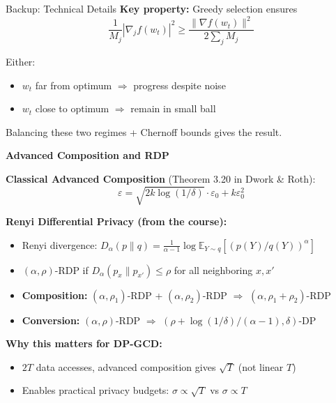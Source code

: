 \documentclass[10pt]{beamer}
\begin{document}
\begin{frame}[allowframebreaks]{Backup: Technical Details}
\vspace{0.5em}
\textbf{Key property:} Greedy selection ensures
\[
\frac{1}{M_j} |\nabla_j f(w_t)|^2 \geq \frac{\|\nabla f(w_t)\|^2}{2 \sum_j M_j}
\]

\vspace{0.5em}
Either:
\begin{itemize}
\item $w_t$ far from optimum $\Rightarrow$ progress despite noise
\item $w_t$ close to optimum $\Rightarrow$ remain in small ball
\end{itemize}

Balancing these two regimes + Chernoff bounds gives the result.

\framebreak

\textbf{Advanced Composition and RDP}

\vspace{0.5em}
\textbf{Classical Advanced Composition} (Theorem 3.20 in Dwork \& Roth):
\[
\varepsilon = \sqrt{2k\log(1/\delta)} \cdot \varepsilon_0 + k\varepsilon_0^2
\]

\vspace{0.5em}
\textbf{Renyi Differential Privacy (from the course):}
\begin{itemize}
\item Renyi divergence: $D_\alpha(p\|q) = \frac{1}{\alpha-1}\log \mathbb{E}_{Y \sim q}[(p(Y)/q(Y))^\alpha]$
\item $(\alpha, \rho)$-RDP if $D_\alpha(p_{x}\|p_{x'}) \leq \rho$ for all neighboring $x, x'$
\item \textbf{Composition:} $(\alpha, \rho_1)$-RDP + $(\alpha, \rho_2)$-RDP $\Rightarrow$ $(\alpha, \rho_1 + \rho_2)$-RDP
\item \textbf{Conversion:} $(\alpha, \rho)$-RDP $\Rightarrow$ $(\rho + \log(1/\delta)/(\alpha-1), \delta)$-DP
\end{itemize}

\vspace{0.5em}
\textbf{Why this matters for DP-GCD:}
\begin{itemize}
\item $2T$ data accesses, advanced composition gives $\sqrt{T}$ (not linear $T$)
\item Enables practical privacy budgets: $\sigma \propto \sqrt{T}$ vs $\sigma \propto T$
\end{itemize}
\end{frame}
\end{document}
